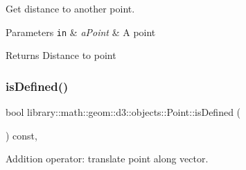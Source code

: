 Get distance to another point. 


\begin{DoxyParams}[1]{Parameters}
\mbox{\tt in}  & {\em a\+Point} & A point \\
\hline
\end{DoxyParams}
\begin{DoxyReturn}{Returns}
Distance to point 
\end{DoxyReturn}
\mbox{\label{classlibrary_1_1math_1_1geom_1_1d3_1_1objects_1_1_point_a9874289efeb457ada4b32d7eb1e012f6}} 
\subsubsection{\texorpdfstring{is\+Defined()}{isDefined()}}
{\footnotesize\ttfamily bool library\+::math\+::geom\+::d3\+::objects\+::\+Point\+::is\+Defined (\begin{DoxyParamCaption}{ }\end{DoxyParamCaption}) const\hspace{0.3cm}{\ttfamily [override]}, {\ttfamily [virtual]}}



Addition operator\+: translate point along vector. 



